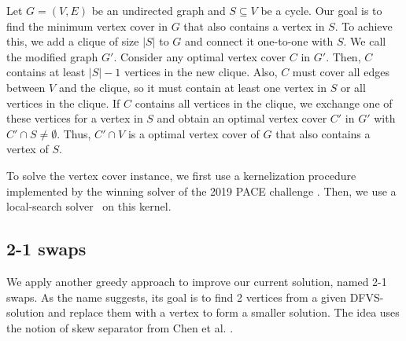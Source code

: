 Let $G = (V,E)$ be an undirected graph and $S \subseteq V$ be a cycle. Our goal is to find the minimum vertex cover in $G$ that also contains a vertex in $S$. To achieve this, we add a clique of size $|S|$ to $G$ and connect it one-to-one with $S$. We call the modified graph $G'$.
Consider any optimal vertex cover $C$ in $G'$. Then, $C$ contains at least $|S|-1$ vertices in the new clique.
Also, $C$ must cover all edges between $V$ and the clique, so it must contain at least one vertex in $S$ or all vertices in the clique.
If $C$ contains all vertices in the clique, we exchange one of these vertices for a vertex in $S$ and obtain an optimal vertex cover $C'$ in $G'$ with $C' \cap S \neq \emptyset$.
Thus, $C'\cap V$ is a optimal vertex cover of $G$ that also contains a vertex of $S$.

To solve the vertex cover instance, we first use a kernelization procedure implemented by the winning solver of the 2019 PACE challenge \cite{Hespe2020WeGotYouCoveredTW}.
Then, we use a local-search solver~\cite{Cai2013NuMVCAE} on this kernel.

%


\subsection{2-1 swaps}
We apply another greedy approach to improve our current solution, named 2-1 swaps. As the name suggests, its goal is to find 2 vertices from a given DFVS-solution and replace them with a vertex to form a smaller solution. The idea uses the notion of skew separator from Chen et al. \cite{Chen2008AFA}. 

